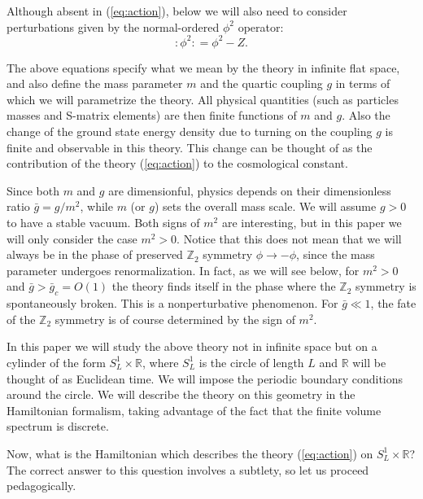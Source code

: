 \documentclass[11pt]{article}
\newcommand{\reef}[1]{(\ref{#1})}
\newcommand{\beq}{\begin{equation}}
\newcommand{\eeq}{\end{equation}}
\def\bZ {\mathbb{Z}}
\def\bR {\mathbb{R}}
\def\bZ {\mathbb{Z}}
\newcommand{\NO}[1]{{:\!#1\!:}}
\numberwithin{equation}{section}
\begin{document}
Although absent in \reef{eq:action}, below we will also need to consider perturbations given by the normal-ordered $\phi^2$ operator:
\beq
\label{eq:NOphi2}
\NO{\phi^2}=\phi^2 - Z. 
\eeq

The above equations specify what we mean by the theory in infinite flat space, and also define the mass parameter $m$ and the quartic coupling $g$ in terms of which we will parametrize the theory. All physical quantities (such as particles masses and S-matrix elements) are then finite functions of $m$ and $g$. Also the change of the ground state energy density due to turning on the coupling $g$ is finite and observable in this theory. This change can be thought of as the contribution of the theory \reef{eq:action} to the cosmological constant.

Since both $m$ and $g$ are dimensionful, physics depends on their dimensionless ratio $\bar g=g/m^2$, while $m$ (or $g$) sets the overall mass scale. We will assume $g>0$ to have a stable vacuum. Both signs of $m^2$ are interesting, but in this paper we will only consider the case $m^2>0$. Notice that this does not mean that we will always be in the phase of preserved $\bZ_2$ symmetry $\phi\to-\phi$, since the mass parameter undergoes renormalization. In fact, as we will see below, for $m^2>0$ and $\bar g>\bar g_c=O(1)$ the theory finds itself in the phase where the $\bZ_2$ symmetry is spontaneously broken. This is a nonperturbative phenomenon. For $\bar g\ll1$, the fate of the $\bZ_2$ symmetry is of course determined by the sign of $m^2$.

In this paper we will study the above theory not in infinite space but on a cylinder of the form $S_L^1\times \bR$, where $S_L^1$ is the circle of length $L$ and $\bR$ will be thought of as Euclidean time. We will impose the periodic boundary conditions around the circle. We will describe the theory on this geometry in the Hamiltonian formalism, taking advantage of the fact that the finite volume spectrum is discrete. 

Now, what is the Hamiltonian which describes the theory \reef{eq:action} on $S_L^1\times \bR$? The correct answer to this question involves a subtlety, so let us proceed pedagogically. 
\end{document}
